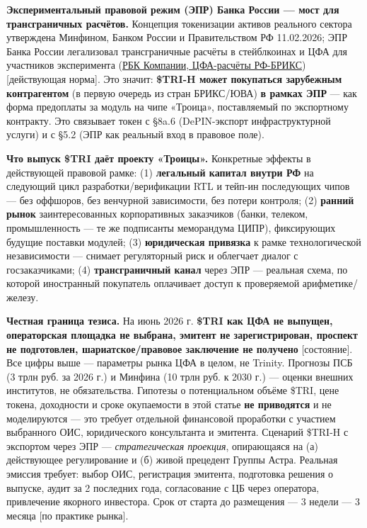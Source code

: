 \documentclass[
  russian,
]{article}
\begin{document}
\textbf{Экспериментальный правовой режим (ЭПР) Банка России --- мост для
трансграничных расчётов.} Концепция токенизации активов реального
сектора утверждена Минфином, Банком России и Правительством РФ
11.02.2026; ЭПР Банка России легализовал трансграничные расчёты в
стейблкоинах и ЦФА для участников эксперимента
(\href{https://companies.rbc.ru/amp/news/655dc1c7-2add-4088-96eb-b697b1ceb563/}{РБК
Компании, ЦФА-расчёты РФ-БРИКС}) {[}действующая норма{]}. Это значит:
\textbf{\$TRI-H может покупаться зарубежным контрагентом} (в первую
очередь из стран БРИКС/ЮВА) \textbf{в рамках ЭПР} --- как форма
предоплаты за модуль на чипе «Троица», поставляемый по экспортному
контракту. Это связывает токен с §8a.6 (DePIN-экспорт инфраструктурной
услуги) и с §5.2 (ЭПР как реальный вход в правовое поле).

\textbf{Что выпуск \$TRI даёт проекту «Троицы».} Конкретные эффекты в
действующей правовой рамке: (1) \textbf{легальный капитал внутри РФ} на
следующий цикл разработки/верификации RTL и тейп-ин последующих чипов
--- без оффшоров, без венчурной зависимости, без потери контроля; (2)
\textbf{ранний рынок} заинтересованных корпоративных заказчиков (банки,
телеком, промышленность --- те же подписанты меморандума ЦИПР),
фиксирующих будущие поставки модулей; (3) \textbf{юридическая привязка}
к рамке технологической независимости --- снимает регуляторный риск и
облегчает диалог с госзаказчиками; (4) \textbf{трансграничный канал}
через ЭПР --- реальная схема, по которой иностранный покупатель
оплачивает доступ к проверяемой арифметике/железу.

\textbf{Честная граница тезиса.} На июнь 2026 г. \textbf{\$TRI как ЦФА
не выпущен, операторская площадка не выбрана, эмитент не
зарегистрирован, проспект не подготовлен, шариатское/правовое заключение
не получено} {[}состояние{]}. Все цифры выше --- параметры рынка ЦФА в
целом, не Trinity. Прогнозы ПСБ (3 трлн руб. за 2026 г.) и Минфина (10
трлн руб. к 2030 г.) --- оценки внешних институтов, не обязательства.
Гипотезы о потенциальном объёме \$TRI, цене токена, доходности и сроке
окупаемости в этой статье \textbf{не приводятся} и не моделируются ---
это требует отдельной финансовой проработки с участием выбранного ОИС,
юридического консультанта и эмитента. Сценарий \$TRI-H с экспортом через
ЭПР --- \emph{стратегическая проекция}, опирающаяся на (а) действующее
регулирование и (б) живой прецедент Группы Астра. Реальная эмиссия
требует: выбор ОИС, регистрация эмитента, подготовка решения о выпуске,
аудит за 2 последних года, согласование с ЦБ через оператора,
привлечение якорного инвестора. Срок от старта до размещения --- 3
недели --- 3 месяца {[}по практике рынка{]}.
\end{document}

